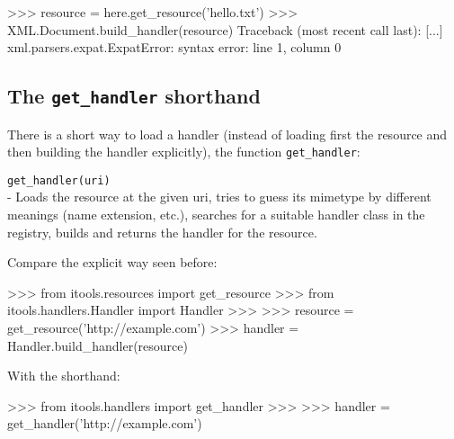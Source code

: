 \begin{code}
    >>> resource = here.get_resource('hello.txt')
    >>> XML.Document.build_handler(resource)
    Traceback (most recent call last):
      [...]
    xml.parsers.expat.ExpatError: syntax error: line 1, column 0
\end{code}


\subsection{The {\tt get\_handler} shorthand}

There is a short way to load a handler (instead of loading first the resource
and then building the handler explicitly), the function {\tt get\_handler}:

\begin{api}
  {\tt get\_handler(uri)}\\
  - Loads the resource at the given uri, tries to guess its mimetype by
  different meanings (name extension, etc.), searches for a suitable
  handler class in the registry, builds and returns the handler for
  the resource.
\end{api}

Compare the explicit way seen before:

\begin{code}
    >>> from itools.resources import get_resource
    >>> from itools.handlers.Handler import Handler
    >>>
    >>> resource = get_resource('http://example.com')
    >>> handler = Handler.build_handler(resource)
\end{code}

With the shorthand:

\begin{code}
    >>> from itools.handlers import get_handler
    >>>
    >>> handler = get_handler('http://example.com')
\end{code}